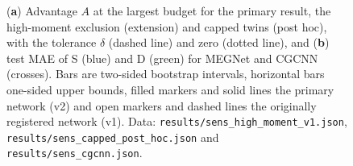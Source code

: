 \begin{figure}[htbp]
\centering
{}
\caption{(\textbf{a}) Advantage $A$ at the largest budget for the primary result, the high-moment exclusion (extension) and
capped twins (post hoc), with the tolerance $\delta$ (dashed line) and zero (dotted line), and (\textbf{b}) test MAE of
S (blue) and D (green) for MEGNet and CGCNN (crosses). Bars are two-sided bootstrap intervals, horizontal bars one-sided upper bounds, filled markers and solid lines the
primary network (v2) and open markers and dashed lines the originally registered network (v1). Data:
\texttt{results/sens\_high\_moment\_v1.json}, \texttt{results/sens\_capped\_post\_hoc.json} and
\texttt{results/sens\_cgcnn.json}.}
\label{fig:sens}
\end{figure}
\FloatBarrier
